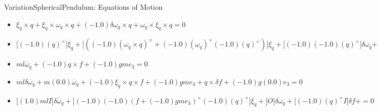 VariationSphericalPendulum: Equations of Motion
\begin{itemize}
\item $\dot{\xi_{q}}\times q+\xi_{q}\times \omega_{q}\times q+(-1.0) \delta \omega_{q}\times q+\omega_{q}\times \xi_{q}\times q=0$
\item $\Big[(-1.0) {(q)}^\times\Big]\dot{\xi_{q}}+\Big[((-1.0) {(\omega_{q}\times q)}^\times+(-1.0) {(\omega_{q})}^\times (-1.0) {(q)}^\times)\Big]\xi_{q}+\Big[(-1.0) (-1.0) {(q)}^\times\Big]\delta \omega_{q}+=0$
\item $m l \dot{\omega_{q}}+(-1.0) q\times f+(-1.0) g m e_3=0$
\item $m l \delta \dot{\omega_{q}}+m (0.0) \dot{\omega_{q}}+(-1.0) \xi_{q}\times q\times f+(-1.0) g m e_3+q\times \delta f+(-1.0) g (0.0) e_3=0$
\item $\Big[(1.0) m l I\Big]\delta \dot{\omega_{q}}+\Big[(-1.0) (-1.0) {(f+(-1.0) g m e_3)}^\times (-1.0) {(q)}^\times\Big]\xi_{q}+\Big[O\Big]\delta \omega_{q}+\Big[(-1.0) {(q)}^\times I\Big]\delta f+=0$
\end{itemize}